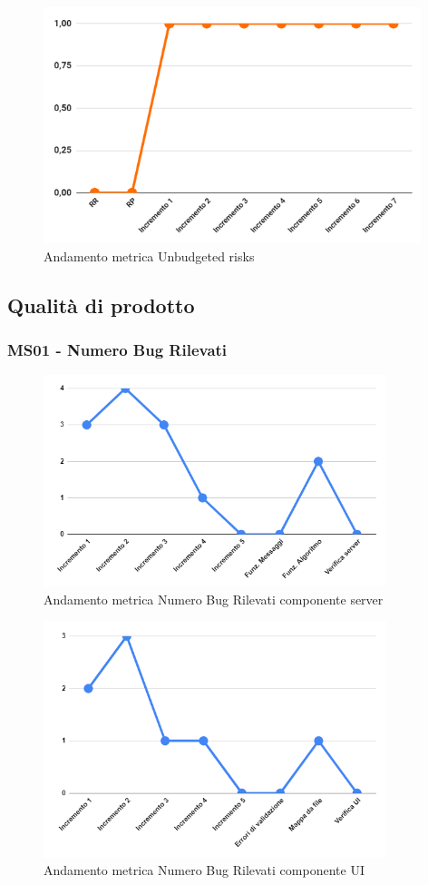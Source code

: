 \begin{figure}[H]
	\centering
	\includegraphics[width=11cm]{images/unbudgeted_risks.png}
	\caption{Andamento metrica Unbudgeted risks}
\end{figure}

\subsection{Qualità di prodotto}

\subsubsection{MS01 - Numero Bug Rilevati}
\begin{figure}[H]
	\centering
	\includegraphics[width=10cm]{images/metricheServer/bug_rilevati.png}
	\caption{Andamento metrica Numero Bug Rilevati componente server}
\end{figure}
\begin{figure}[H]
	\centering
	\includegraphics[width=10cm]{images/metricheUI/bug_rilevati.png}
	\caption{Andamento metrica Numero Bug Rilevati componente UI}
\end{figure}

